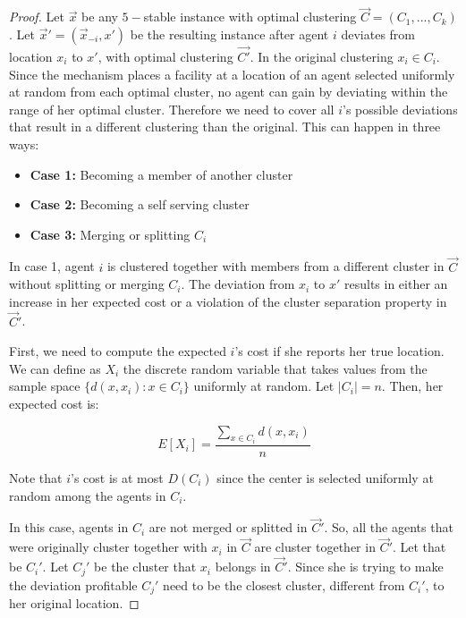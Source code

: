 \begin{theorem}

\end{theorem}

\begin{proof}
Let $\vec{x}$ be any $5-$stable instance with optimal clustering $\vec{C} = (C_1,...,C_k)$. Let $\vec{x}' = (\vec{x}_{-i},x')$ be the resulting instance after agent $i$ deviates from location $x_i$ to $x'$, with optimal clustering $\vec{C'}$. In the original clustering $x_i\in C_i$. Since the mechanism places a facility at a location of an agent selected uniformly at random from each optimal cluster, no agent can gain by deviating within the range of her optimal cluster. Therefore we need to cover all $i$'s possible deviations that result in a different clustering than the original. This can happen in three ways:

\begin{itemize}
\setlength\itemsep{0.1em}
  \item[]\textbf{Case 1:} Becoming a member of another cluster
  \item[]\textbf{Case 2:} Becoming a self serving cluster
  \item[]\textbf{Case 3:} Merging or splitting $C_i$
\end{itemize}


In case 1, agent $i$ is clustered together with members from a different cluster in $\vec{C}$ without splitting or merging $C_i$. The deviation from $x_i$ to $x'$ results in either an increase in her expected cost or a violation of the cluster separation property in $\vec{C}'$.


First, we need to compute the expected $i$'s cost if she reports her true location. We can define as $X_i$ the discrete random variable that takes values from the sample space $\{ d(x,x_i): x\in C_i\}$ uniformly at random. Let $|C_i|=n$. Then, her expected cost is:

\[ E[X_i] = \frac{\sum_{x\in C_i} d(x,x_i)}{n} \]

Note that $i$'s cost is at most $D(C_i)$ since the center is selected uniformly at random among the agents in $C_i$.



In this case, agents in $C_i$ are not merged or splitted in $\vec{C}'$. So, all the agents that were originally cluster together with $x_i$ in $\vec{C}$ are cluster together in $\vec{C}'$. Let that be $C_i'$. %
Let $C_j'$ be the cluster that $x_i$ belongs in $\vec{C}'$. Since she is trying to make the deviation profitable $C_j'$ need to be the closest cluster, different from $C_i'$, to her original location.



\end{proof}
